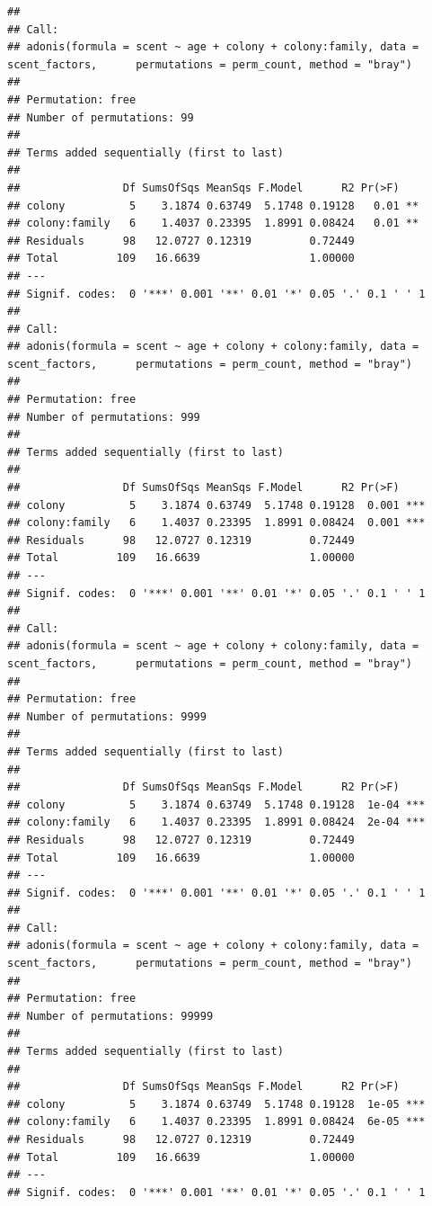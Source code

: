 \documentclass[]{article}
\begin{document}
\begin{verbatim}
## 
## Call:
## adonis(formula = scent ~ age + colony + colony:family, data = scent_factors,      permutations = perm_count, method = "bray") 
## 
## Permutation: free
## Number of permutations: 99
## 
## Terms added sequentially (first to last)
## 
##                Df SumsOfSqs MeanSqs F.Model      R2 Pr(>F)   
## colony          5    3.1874 0.63749  5.1748 0.19128   0.01 **
## colony:family   6    1.4037 0.23395  1.8991 0.08424   0.01 **
## Residuals      98   12.0727 0.12319         0.72449          
## Total         109   16.6639                 1.00000          
## ---
## Signif. codes:  0 '***' 0.001 '**' 0.01 '*' 0.05 '.' 0.1 ' ' 1
## 
## Call:
## adonis(formula = scent ~ age + colony + colony:family, data = scent_factors,      permutations = perm_count, method = "bray") 
## 
## Permutation: free
## Number of permutations: 999
## 
## Terms added sequentially (first to last)
## 
##                Df SumsOfSqs MeanSqs F.Model      R2 Pr(>F)    
## colony          5    3.1874 0.63749  5.1748 0.19128  0.001 ***
## colony:family   6    1.4037 0.23395  1.8991 0.08424  0.001 ***
## Residuals      98   12.0727 0.12319         0.72449           
## Total         109   16.6639                 1.00000           
## ---
## Signif. codes:  0 '***' 0.001 '**' 0.01 '*' 0.05 '.' 0.1 ' ' 1
## 
## Call:
## adonis(formula = scent ~ age + colony + colony:family, data = scent_factors,      permutations = perm_count, method = "bray") 
## 
## Permutation: free
## Number of permutations: 9999
## 
## Terms added sequentially (first to last)
## 
##                Df SumsOfSqs MeanSqs F.Model      R2 Pr(>F)    
## colony          5    3.1874 0.63749  5.1748 0.19128  1e-04 ***
## colony:family   6    1.4037 0.23395  1.8991 0.08424  2e-04 ***
## Residuals      98   12.0727 0.12319         0.72449           
## Total         109   16.6639                 1.00000           
## ---
## Signif. codes:  0 '***' 0.001 '**' 0.01 '*' 0.05 '.' 0.1 ' ' 1
## 
## Call:
## adonis(formula = scent ~ age + colony + colony:family, data = scent_factors,      permutations = perm_count, method = "bray") 
## 
## Permutation: free
## Number of permutations: 99999
## 
## Terms added sequentially (first to last)
## 
##                Df SumsOfSqs MeanSqs F.Model      R2 Pr(>F)    
## colony          5    3.1874 0.63749  5.1748 0.19128  1e-05 ***
## colony:family   6    1.4037 0.23395  1.8991 0.08424  6e-05 ***
## Residuals      98   12.0727 0.12319         0.72449           
## Total         109   16.6639                 1.00000           
## ---
## Signif. codes:  0 '***' 0.001 '**' 0.01 '*' 0.05 '.' 0.1 ' ' 1
\end{verbatim}
\end{document}
